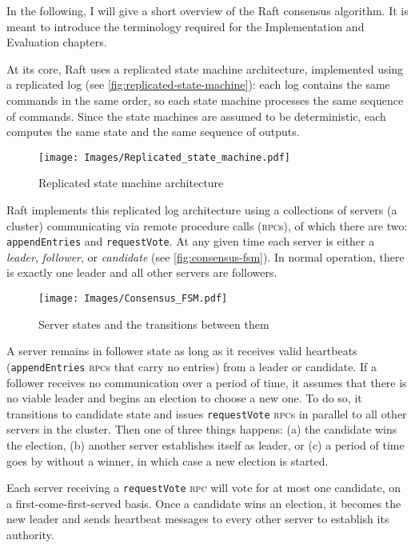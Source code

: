 \documentclass[11pt,chapterprefix=true,toc=bibliography,numbers=noendperiod,
               footnotes=multiple,twoside]{scrreprt}
\newcommand{\requestVoteRPC}[0]{\texttt{requestVote} \textsc{rpc}}
\newcommand{\appendEntriesRPC}[0]{\texttt{appendEntries} \textsc{rpc}}
\begin{document}
In the following, I will give a short overview of the Raft consensus algorithm. It is meant to introduce the terminology required for the Implementation and Evaluation chapters.

At its core, Raft uses a replicated state machine architecture, implemented using a replicated log (see \autoref{fig:replicated-state-machine}): each log contains the same commands in the same order, so each state machine processes the same sequence of commands. Since the state machines are assumed to be deterministic, each computes the same state and the same sequence of outputs.

\begin{figure}[h]
    \centering
    \texttt{[image: Images/Replicated\_state\_machine.pdf]}
    \caption{Replicated state machine architecture}
    \label{fig:replicated-state-machine}
\end{figure}

Raft implements this replicated log architecture using a collections of servers (a cluster) communicating via remote procedure calls (\textsc{rpc}s), of which there are two: \texttt{appendEntries} and \texttt{requestVote}. At any given time each server is either a \emph{leader}, \emph{follower}, or \emph{candidate} (see \autoref{fig:consensus-fsm}). In normal operation, there is exactly one leader and all other servers are followers.

\begin{figure}[h]
    \centering
    \texttt{[image: Images/Consensus\_FSM.pdf]}
    \caption{Server states and the transitions between them}
    \label{fig:consensus-fsm}
\end{figure}


A server remains in follower state as long as it receives valid heartbeats (\appendEntriesRPC s that carry no entries) from a leader or candidate. If a follower receives no communication over a period of time, it assumes that there is no viable leader and begins an election to choose a new one. To do so, it transitions to candidate state and issues \requestVoteRPC s in parallel to all other servers in the cluster. Then one of three things happens: (a) the candidate wins the election, (b) another server establishes itself as leader, or (c) a period of time goes by without a winner, in which case a new election is started.

Each server receiving a \requestVoteRPC{} will vote for at most one candidate, on a first-come-first-served basis. Once a candidate wins an election, it becomes the new leader and sends heartbeat messages to every other server to establish its authority.
\end{document}
